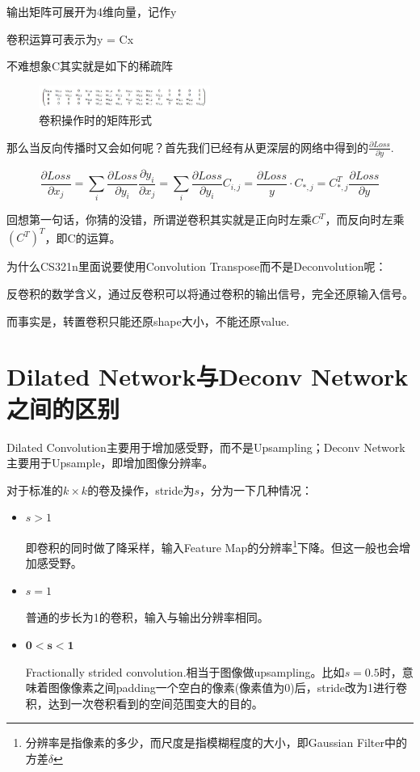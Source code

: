 输出矩阵可展开为4维向量，记作y

卷积运算可表示为y = Cx

不难想象C其实就是如下的稀疏阵
\begin{figure}[!htbp]
\centering
\includegraphics[width=0.5\textwidth]{DLTips/Deconvolution2.jpg}
\caption{卷积操作时的矩阵形式}
\label{Deconvolution2}
\end{figure}

那么当反向传播时又会如何呢？首先我们已经有从更深层的网络中得到的$\frac{\partial Loss}{\partial y}$.

\begin{displaymath}
\frac{\partial{Loss}}{\partial{x_j}} = \sum_{i}\frac{\partial{Loss}}{\partial y_i} \frac{\partial y_i}{\partial{x_j}} = \sum_{i} \frac{\partial{Loss}}{\partial y_i} C_{i, j} = \frac{\partial{Loss}}{y} \cdot C_{*, j} = C_{*, j}^T \frac{\partial{Loss}}{\partial y}
\end{displaymath}

回想第一句话，你猜的没错，所谓逆卷积其实就是正向时左乘$C^T$，而反向时左乘$(C^T)^T$，即C的运算。

为什么CS321n里面说要使用Convolution Transpose而不是Deconvolution呢：

反卷积的数学含义，通过反卷积可以将通过卷积的输出信号，完全还原输入信号。

而事实是，转置卷积只能还原shape大小，不能还原value.

\section{Dilated Network与Deconv Network之间的区别}
Dilated Convolution主要用于增加感受野，而不是Upsampling；Deconv Network主要用于Upsample，即增加图像分辨率。

对于标准的$k \times k$的卷及操作，stride为$s$，分为一下几种情况：
\begin{itemize}
\item $s > 1$

即卷积的同时做了降采样，输入Feature Map的分辨率\footnote{分辨率是指像素的多少，而尺度是指模糊程度的大小，即Gaussian Filter中的方差$\delta$}下降。但这一般也会增加感受野。

\item $s = 1$

普通的步长为1的卷积，输入与输出分辨率相同。

\item $\mathbf{0 < s < 1}$

Fractionally strided convolution.相当于图像做upsampling。比如$s=0.5$时，意味着图像像素之间padding一个空白的像素(像素值为0)后，stride改为1进行卷积，达到一次卷积看到的空间范围变大的目的。

\end{itemize}

